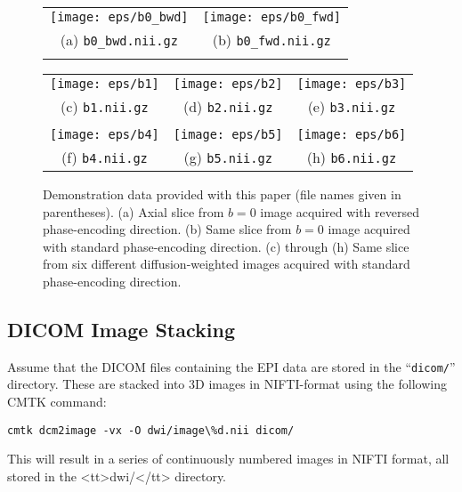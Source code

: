 \documentclass{InsightArticle}
\begin{document}
\begin{figure}[tbp]
\begin{center}
\begin{tabular}{cc}
\texttt{[image: eps/b0\_bwd]} &
\texttt{[image: eps/b0\_fwd]} \\
(a) \texttt{b0\_bwd.nii.gz} & (b)  \texttt{b0\_fwd.nii.gz}\\
\\
\end{tabular}
\begin{tabular}{ccc}
\texttt{[image: eps/b1]} &
\texttt{[image: eps/b2]} &
\texttt{[image: eps/b3]} \\
(c) \texttt{b1.nii.gz} & (d) \texttt{b2.nii.gz} & (e) \texttt{b3.nii.gz} \\
\\
\texttt{[image: eps/b4]} &
\texttt{[image: eps/b5]} &
\texttt{[image: eps/b6]} \\
(f) \texttt{b4.nii.gz} & (g) \texttt{b5.nii.gz} & (h) \texttt{b6.nii.gz} \\
\end{tabular}
\end{center}
\caption{Demonstration data provided with this paper (file names given in
  parentheses). (a) Axial slice from $b=0$ image acquired with reversed phase-encoding
  direction. (b) Same slice from $b=0$ image acquired with standard
  phase-encoding direction. (c) through (h) Same slice from six different
  diffusion-weighted images acquired with standard phase-encoding direction.}
\label{fig:B0FwBw}
\end{figure}

\subsection{DICOM Image Stacking}

Assume that the DICOM files containing the EPI data are stored in the
``\texttt{dicom/}'' directory. These are stacked into 3D images in
NIFTI-format using the following CMTK command:
\begin{verbatim}
cmtk dcm2image -vx -O dwi/image\%d.nii dicom/
\end{verbatim}

This will result in a series of continuously numbered images in NIFTI format,
all stored in the <tt>dwi/</tt> directory.
\end{document}
